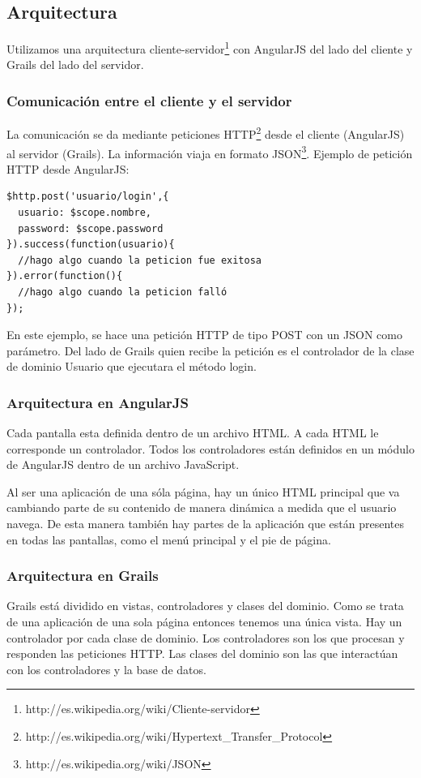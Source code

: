 \subsection{Arquitectura}
Utilizamos una arquitectura cliente-servidor\footnote{http://es.wikipedia.org/wiki/Cliente-servidor} con AngularJS del lado del cliente y Grails del lado del servidor.

\subsubsection{Comunicación entre el cliente y el servidor}
La comunicación se da mediante peticiones HTTP\footnote{http://es.wikipedia.org/wiki/Hypertext\_Transfer\_Protocol} desde el cliente (AngularJS) al servidor (Grails). La información viaja en formato JSON\footnote{http://es.wikipedia.org/wiki/JSON}. Ejemplo de petición HTTP desde AngularJS:

\begin{verbatim}
$http.post('usuario/login',{
  usuario: $scope.nombre,
  password: $scope.password
}).success(function(usuario){
  //hago algo cuando la peticion fue exitosa
}).error(function(){
  //hago algo cuando la peticion falló
});		
\end{verbatim}

En este ejemplo, se hace una petición HTTP de tipo POST con un JSON como parámetro. Del lado de Grails quien recibe la petición es el controlador de la clase de dominio Usuario que ejecutara el método login.

\subsubsection{Arquitectura en AngularJS}
Cada pantalla esta definida dentro de un archivo HTML. A cada HTML le corresponde un controlador. Todos los controladores están definidos en un módulo de AngularJS dentro de un archivo JavaScript.

Al ser una aplicación de una sóla página, hay un único HTML principal que va cambiando parte de su contenido de manera dinámica a medida que el usuario navega. De esta manera también hay partes de la aplicación que están presentes en todas las pantallas, como el menú principal y el pie de página.

\subsubsection{Arquitectura en Grails}
Grails está dividido en vistas, controladores y clases del dominio. Como se trata de una aplicación de una sola página entonces tenemos una única vista. Hay un controlador por cada clase de dominio. Los controladores son los que procesan y responden las peticiones HTTP. Las clases del dominio son las que interactúan con los controladores y la base de datos.

